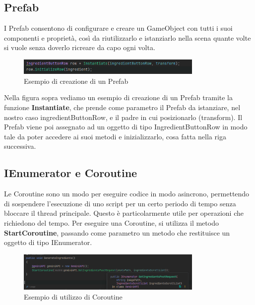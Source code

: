 \subsection{Prefab}
I Prefab consentono di configurare e creare un GameObject con tutti i suoi componenti e proprietà, così da riutilizzarlo e istanziarlo nella scena quante volte si vuole senza doverlo ricreare da capo ogni volta.
\begin{figure}[H]
    \centering
    \includegraphics[width=0.8\textwidth,height=\textheight,keepaspectratio]{figures/chapter_1/prefabInstantiate.png}
    \caption{Esempio di creazione di un Prefab}
\end{figure}

Nella figura sopra vediamo un esempio di creazione di un Prefab tramite la funzione \textbf{Instantiate}, che prende come parametro il Prefab da istanziare, nel nostro caso ingredientButtonRow, e il padre in cui posizionarlo (transform). Il Prefab viene poi assegnato ad un oggetto di tipo IngredientButtonRow in modo tale da poter accedere ai suoi metodi e inizializzarlo, cosa fatta nella riga successiva. \cite{UnityPrefabs}


\subsection{IEnumerator e Coroutine}
Le Coroutine sono un modo per eseguire codice in modo asincrono, permettendo di sospendere l'esecuzione di uno script per un certo periodo di tempo senza bloccare il thread principale. Questo è particolarmente utile per operazioni che richiedono del tempo. Per eseguire una Coroutine, si utilizza il metodo \textbf{StartCoroutine}, passando come parametro un metodo che restituisce un oggetto di tipo IEnumerator.
\begin{figure}[H]
    \centering
    \includegraphics[width=0.8\textwidth,height=\textheight,keepaspectratio]{figures/chapter_1/UnityIEnumeratorCoroutine.png}
    \caption{Esempio di utilizzo di Coroutine}
\end{figure}

